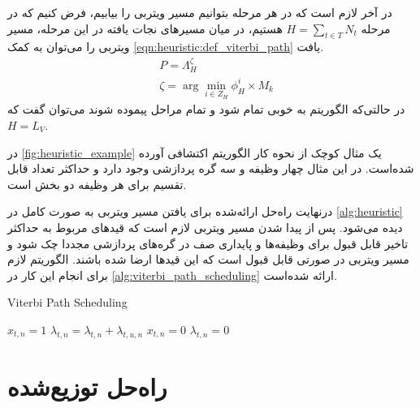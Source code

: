 	در آخر لازم است که در هر مرحله بتوانیم مسیر ویتربی را بیابیم، فرض کنیم که در مرحله $\displaystyle H = \sum_{t \in T}N_t$ هستیم، در میان مسیرهای نجات یافته در این مرحله، مسیر ویتربی را می‌توان به کمک \cref{eqn:heuristic:def_viterbi_path} یافت.
\begin{subequations}
	\begin{align}\label{eqn:heuristic:def_viterbi_path}
		&P = \Lambda_H^\zeta \\
		&\zeta = \arg \min_{i \in Z_H} \phi_H^i \times M_k
	\end{align}
\end{subequations}
در حالتی‌که الگوریتم به خوبی تمام شود و تمام مراحل پیموده شوند می‌توان گفت که $H=L_V$.

در \cref{fig:heuristic_example} یک مثال کوچک از نحوه کار الگوریتم اکتشافی آورده شده‌است. در این مثال چهار وظیفه و سه گره پردازشی وجود دارد و حداکثر تعداد قابل تقسیم برای هر وظیفه دو بخش است.

درنهایت راه‌حل ارائه‌شده برای یافتن مسیر ویتربی به صورت کامل در \cref{alg:heuristic} دیده می‌شود. پس‌ از پیدا شدن مسیر ویتربی لازم است که قیدهای مربوط به حداکثر تاخیر قابل قبول برای وظیفه‌ها و پایداری صف در گره‌های پردازشی مجددا چک شود و مسیر ویتربی در صورتی قابل قبول است که این قیدها ارضا شده باشند. الگوریتم لازم برای انجام این کار در \cref{alg:viterbi_path_scheduling} ارا‌ئه شده‌است. 

\begin{latin}
	\begin{algorithm}
		\caption{Viterbi Path Scheduling}
		\label{alg:viterbi_path_scheduling}
		\begin{algorithmic}[1]
					\State $x_{t,n} = 1$
					\State $\lambda_{t,n} = \lambda_{t,n} + \lambda_{t,u,n}$
				\EndIf
					\State $x_{t,n} = 0$
					\State $\lambda_{t,n} = 0$
				\EndIf
			\EndFor
		\end{algorithmic}
	\end{algorithm}
\end{latin}

\section{راه‌حل توزیع‌شده}

